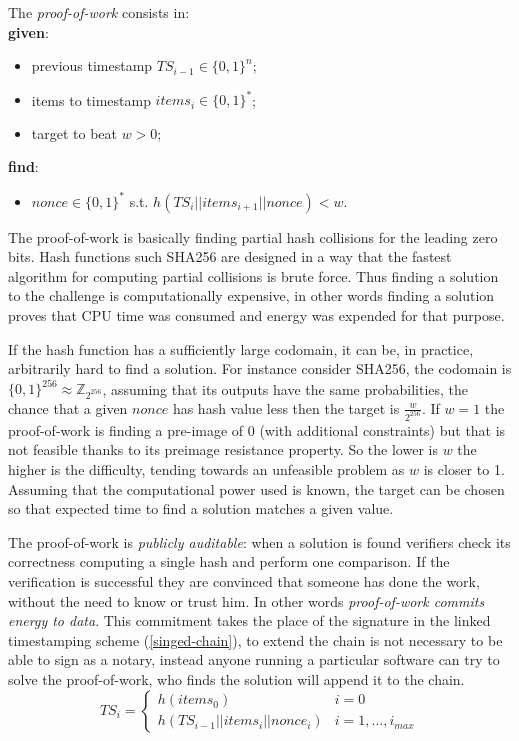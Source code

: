 \begin{mydef}The {\textit{proof-of-work}} consists in:
\label{pow}
\\
\textbf{given}:
\begin{itemize}
	\item previous timestamp $TS_{i-1} \in \{0,1\}^n$;
	\item items to timestamp $items_i \in \{0,1\}^*$;
	\item target to beat $w>0$;
\end{itemize}
\textbf{find}:
\begin{itemize}
	\item $nonce \in \{0,1\}^*$ s.t. $h(TS_i || items_{i+1} || nonce) < w$.
\end{itemize}
\end{mydef}

The proof-of-work is basically finding partial hash collisions for the leading zero bits. Hash functions such SHA256 are designed in a way that the fastest algorithm for computing partial collisions is brute force. Thus finding a solution to the challenge is computationally expensive, in other words finding a solution proves that CPU time was consumed and energy was expended for that purpose.
 
If the hash function has a sufficiently large codomain, it can be, in practice, arbitrarily hard to find a solution. For instance consider SHA256, the codomain is $\{0,1\}^{256} \approx \mathbb{Z}_{2^{256}}$, assuming that its outputs have the same probabilities, the chance that a given $nonce$ has hash value less then the target is $\frac{w}{2^{256}}$.  
If $w=1$ the proof-of-work is finding a pre-image of 0 (with additional constraints) but that is not feasible thanks to its preimage resistance property. 
So the lower is $w$ the higher is the difficulty, tending towards an unfeasible problem as $w$ is closer to 1. 
Assuming that the computational power used is known, the target can be chosen so that expected time to find a solution matches a given value.

The proof-of-work is \textit{publicly auditable}: when a solution is found verifiers check its correctness computing a single hash and perform one comparison. If the verification is successful they are convinced that someone has done the work, without the need to know or trust him. In other words \textit{proof-of-work commits energy to data}.
This commitment takes the place of the signature in the linked timestamping scheme (\ref{singed-chain}), to extend the chain is not necessary to be able to sign as a notary, instead anyone running a particular software can try to solve the proof-of-work, who finds the solution will append it to the chain. 
\begin{equation}
\label{chain-nonce}
TS_i =   
\begin{cases} 
h(items_0) & i=0\\ 
 h(TS_{i-1}||items_i||nonce_i) & i=1, ..., i_{max} 
\end{cases}
\end{equation}

